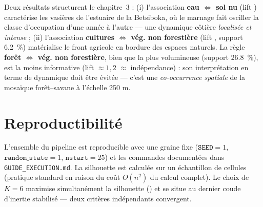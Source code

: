 Deux résultats structurent le chapitre~3 : (i) l'association
\textbf{eau $\Leftrightarrow$ sol nu} (lift ) caractérise les
vasières de l'estuaire de la Betsiboka, où le marnage fait osciller la classe
d'occupation d'une année à l'autre — une dynamique côtière \emph{localisée et
intense} ; (ii) l'association \textbf{cultures $\Leftrightarrow$ vég. non
forestière} (lift , support \SI{6,2}{\percent}) matérialise le
front agricole en bordure des espaces naturels. La règle
\textbf{forêt $\Leftrightarrow$ vég. non forestière}, bien que la plus
volumineuse (support \SI{26,8}{\percent}), est la moins informative
(lift $\approx 1{,}2$ $\approx$ indépendance) : son interprétation en terme de
dynamique doit être évitée — c'est une \emph{co-occurrence spatiale} de la
mosaïque forêt--savane à l'échelle 250 m.

\section{Reproductibilité}

L'ensemble du pipeline est reproducible avec une graine fixe
($\texttt{SEED}=1$, $\texttt{random\_state}=1$, $\texttt{nstart}=25$) et les
commandes documentées dans \texttt{GUIDE\_EXECUTION.md}. La silhouette est
calculée sur un échantillon de  cellules (pratique standard en
raison du coût $O(n^2)$ du calcul complet). Le choix de $K=6$ maximise
simultanément la silhouette () et se situe au dernier coude
d'inertie stabilisé — deux critères indépendants convergent.

